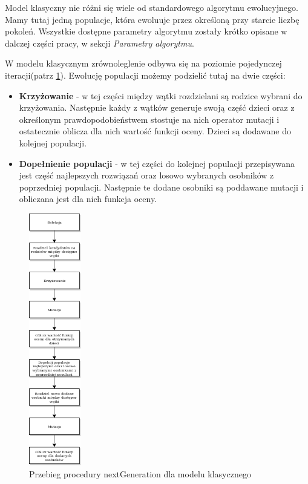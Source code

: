 Model klasyczny nie różni się wiele od standardowego algorytmu ewolucyjnego. Mamy tutaj jedną populacje, która ewoluuje przez 
określoną przy starcie liczbę pokoleń. Wszystkie dostępne parametry algorytmu zostały krótko opisane w dalczej części pracy, 
w sekcji \textit{Parametry algorytmu}.

W modelu klasycznym zrównoleglenie odbywa się na poziomie pojedynczej iteracji(patrz \ref{next_gen_klasyczny_img}). 
Ewolucję populacji możemy podzielić tutaj na dwie części:
\begin{itemize}
    \item \textbf{Krzyżowanie} - w tej części między wątki rozdzielani są rodzice wybrani do krzyżowania. Następnie każdy z wątków generuje swoją część 
    dzieci oraz z określonym prawdopodobieństwem stostuje na nich operator mutacji i ostatecznie oblicza dla nich wartość funkcji oceny. 
    Dzieci są dodawane do kolejnej populacji.
    \item \textbf{Dopełnienie populacji} - w tej części do kolejnej populacji przepisywana jest część najlepszych rozwiązań oraz losowo wybranych osobników 
    z poprzedniej populacji. Następnie te dodane osobniki są poddawane mutacji i obliczana jest dla nich funkcja oceny.
\end{itemize}

\begin{figure}[H]
    \centering        
    \includegraphics[width=0.2\textwidth]{img/next_gen_klasyczny.png}
    \caption{Przebieg procedury nextGeneration dla modelu klasycznego}
    \label{next_gen_klasyczny_img}
\end{figure}

